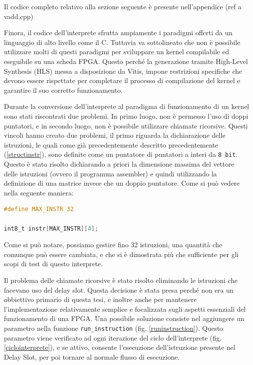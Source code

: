 \vspace{0.3cm}
\noindent Il codice completo relativo alla sezione seguente è presente nell'appendice (ref a vadd.cpp)
\vspace{0.3cm}

\noindent Finora, il codice dell'interprete sfrutta ampiamente i paradigmi offerti da un linguaggio di alto livello come il C.
Tuttavia va sottolineato che non è possibile utilizzare molti di questi paradigmi per sviluppare un kernel compilabile ed eseguibile su una scheda FPGA. Questo perché la generazione tramite High-Level Synthesis (HLS) messa a disposizione da Vitis, impone restrizioni specifiche che devono essere rispettate per completare il processo di compilazione del kernel e garantire il suo corretto funzionamento.

\vspace{0.3cm}

Durante la conversione dell'interprete al paradigma di funzionamento di un kernel sono stati riscontrati due problemi. In primo luogo, non è permesso l'uso di doppi puntatori, e in secondo luogo, non è possibile utilizzare chiamate ricorsive. Questi vincoli hanno creato due problemi, il primo riguarda la dichiarazione delle istruzioni, le quali come già precedentemente descritto precedentemente (\ref{structinstr}), sono definite come un puntatore di puntatori a interi da \texttt{8 bit}. Questo è stato risolto dichiarando a priori la dimensione massima del vettore delle istruzioni (ovvero il programma assembler) e quindi utilizzando la definizione di una matrice invece che un doppio puntatore. Come si può vedere nella seguente maniera: 
\begin{lstlisting}[language=C]
#define MAX_INSTR 32
    
int8_t instr[MAX_INSTR][4];
\end{lstlisting}
Come si può notare, possiamo gestire fino 32 istruzioni, una quantità che comunque può essere cambiata, e che si è dimostrata più che sufficiente per gli scopi di test di questo interprete. 

\vspace{0.3cm}

Il problema delle chiamate ricorsive è stato risolto eliminando le istruzioni che facevano uso del delay slot. Questa decisione è stata presa perché non era un obbiettivo primario di questa tesi, e inoltre anche per mantenere l'implementazione relativamente semplice e focalizzata sugli aspetti essenziali del funzionamento di una FPGA.
Una possibile soluzione consiste nel aggiungere un parametro nella funzione \texttt{run\_instruction} (fig. \ref{runinstruction}). Questo parametro viene verificato ad ogni iterazione del ciclo dell'interprete (fig. \ref{ciclointerprete}), e se attivo, consente l'esecuzione dell'istruzione presente nel Delay Slot, per poi tornare al normale flusso di esecuzione.

